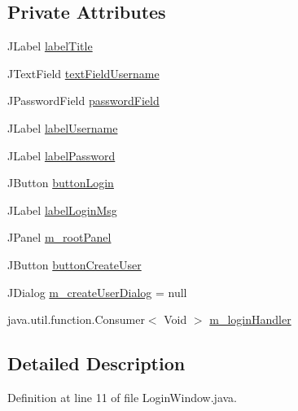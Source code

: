 \subsection*{Private Attributes}
\begin{DoxyCompactItemize}
\item 
J\+Label \hyperlink{classcom_1_1activitytracker_1_1_login_window_a3c4c84a656351094b34320a5c352e685}{label\+Title}
\item 
J\+Text\+Field \hyperlink{classcom_1_1activitytracker_1_1_login_window_aba181dcec114c349a67304406bcce92a}{text\+Field\+Username}
\item 
J\+Password\+Field \hyperlink{classcom_1_1activitytracker_1_1_login_window_ae53353ceea197fe7b93f1b7156112d08}{password\+Field}
\item 
J\+Label \hyperlink{classcom_1_1activitytracker_1_1_login_window_a4999e1461716e42ee4e3de8e3eb47eb9}{label\+Username}
\item 
J\+Label \hyperlink{classcom_1_1activitytracker_1_1_login_window_a8be41422fca8038bd8c2ba49af8ae6ce}{label\+Password}
\item 
J\+Button \hyperlink{classcom_1_1activitytracker_1_1_login_window_ac77d9f8f3a6c697a9847ecd130ac2ef6}{button\+Login}
\item 
J\+Label \hyperlink{classcom_1_1activitytracker_1_1_login_window_a567ae49b39c07840b39eec92fdf92c22}{label\+Login\+Msg}
\item 
J\+Panel \hyperlink{classcom_1_1activitytracker_1_1_login_window_aa62049382baddb801cb25201814efc57}{m\+\_\+root\+Panel}
\item 
J\+Button \hyperlink{classcom_1_1activitytracker_1_1_login_window_a1ff77d6846d01d4a8540371ede091371}{button\+Create\+User}
\item 
J\+Dialog \hyperlink{classcom_1_1activitytracker_1_1_login_window_a49ff7093e29ce7bd22c42ac8099d5d34}{m\+\_\+create\+User\+Dialog} = null
\item 
java.\+util.\+function.\+Consumer$<$ Void $>$ \hyperlink{classcom_1_1activitytracker_1_1_login_window_aab28a8e6372499a8690d524dedeaf9e1}{m\+\_\+login\+Handler}
\end{DoxyCompactItemize}


\subsection{Detailed Description}


Definition at line 11 of file Login\+Window.\+java.



